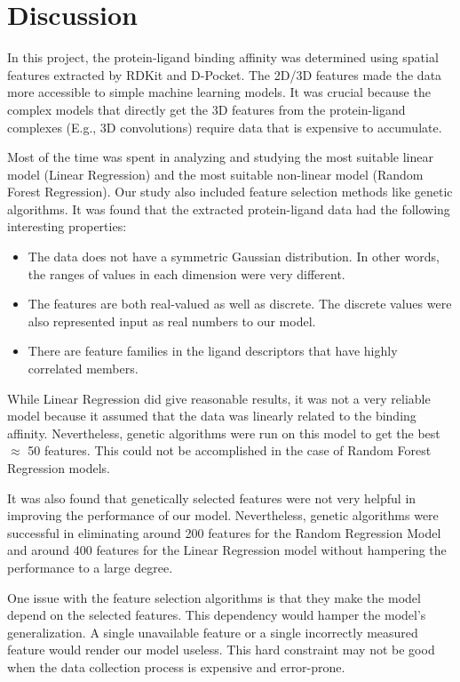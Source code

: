 \documentclass[11pt]{article}
\begin{document}
\section{Discussion}
In this project, the protein-ligand binding affinity was determined using spatial features extracted by RDKit and D-Pocket.
The 2D/3D features made the data more accessible to simple machine learning models. 
It was crucial because the complex models that directly get the 3D features from the protein-ligand complexes (E.g., 3D convolutions) require data that is expensive to accumulate.

Most of the time was spent in analyzing and studying the most suitable linear model (Linear Regression) and the most suitable non-linear model (Random Forest Regression).
Our study also included feature selection methods like genetic algorithms.
It was found that the extracted protein-ligand data had the following interesting properties:
\begin{itemize}
\item The data does not have a symmetric Gaussian distribution.  In other words, the ranges of values in each dimension were very different.
\item The features are both real-valued as well as discrete.  The discrete values were also represented input as real numbers to our model.
\item There are feature families in the ligand descriptors that have highly correlated members.
\end{itemize}

While Linear Regression did give reasonable results,  it was not a very reliable model because it assumed that the data was linearly related to the binding affinity.
Nevertheless,  genetic algorithms were run on this model to get the best $\approx$ 50 features.
This could not be accomplished in the case of Random Forest Regression models.

It was also found that genetically selected features were not very helpful in improving the performance of our model. Nevertheless, genetic algorithms were successful in eliminating around 200 features for the Random Regression Model and around 400 features for the Linear Regression model without hampering the performance to a large degree.

One issue with the feature selection algorithms is that they make the model depend on the selected features.
This dependency would hamper the model's generalization.
A single unavailable feature or a single incorrectly measured feature would render our model useless.
This hard constraint may not be good when the data collection process is expensive and error-prone.
\end{document}
